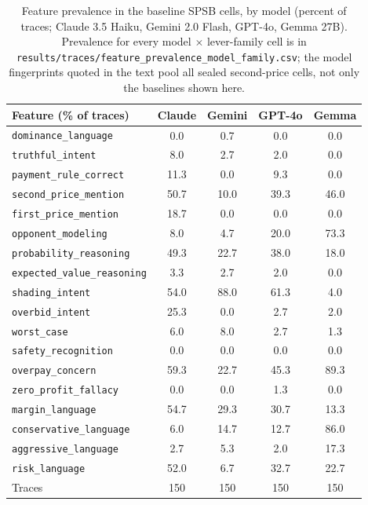 \begin{table}[htbp]
\centering
\footnotesize
\setlength{\tabcolsep}{6pt}
\begin{tabular}{lcccc}
\toprule
Feature (\% of traces) & Claude & Gemini & GPT-4o & Gemma \\
\midrule
\texttt{dominance\_language} & 0.0 & 0.7 & 0.0 & 0.0 \\
\texttt{truthful\_intent} & 8.0 & 2.7 & 2.0 & 0.0 \\
\texttt{payment\_rule\_correct} & 11.3 & 0.0 & 9.3 & 0.0 \\
\texttt{second\_price\_mention} & 50.7 & 10.0 & 39.3 & 46.0 \\
\texttt{first\_price\_mention} & 18.7 & 0.0 & 0.0 & 0.0 \\
\texttt{opponent\_modeling} & 8.0 & 4.7 & 20.0 & 73.3 \\
\texttt{probability\_reasoning} & 49.3 & 22.7 & 38.0 & 18.0 \\
\texttt{expected\_value\_reasoning} & 3.3 & 2.7 & 2.0 & 0.0 \\
\texttt{shading\_intent} & 54.0 & 88.0 & 61.3 & 4.0 \\
\texttt{overbid\_intent} & 25.3 & 0.0 & 2.7 & 2.0 \\
\texttt{worst\_case} & 6.0 & 8.0 & 2.7 & 1.3 \\
\texttt{safety\_recognition} & 0.0 & 0.0 & 0.0 & 0.0 \\
\texttt{overpay\_concern} & 59.3 & 22.7 & 45.3 & 89.3 \\
\texttt{zero\_profit\_fallacy} & 0.0 & 0.0 & 1.3 & 0.0 \\
\texttt{margin\_language} & 54.7 & 29.3 & 30.7 & 13.3 \\
\texttt{conservative\_language} & 6.0 & 14.7 & 12.7 & 86.0 \\
\texttt{aggressive\_language} & 2.7 & 5.3 & 2.0 & 17.3 \\
\texttt{risk\_language} & 52.0 & 6.7 & 32.7 & 22.7 \\
\midrule
Traces & 150 & 150 & 150 & 150 \\
\bottomrule
\end{tabular}
\caption{Feature prevalence in the baseline SPSB cells, by model (percent of traces; Claude 3.5 Haiku, Gemini 2.0 Flash, GPT-4o, Gemma 27B). Prevalence for every model $\times$ lever-family cell is in \texttt{results/traces/feature\_prevalence\_model\_family.csv}; the model fingerprints quoted in the text pool all sealed second-price cells, not only the baselines shown here.}
\label{tab:trace-prevalence-models}
\end{table}

